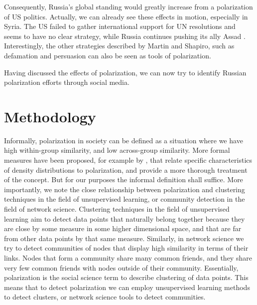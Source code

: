 \documentclass[12pt, authoryear]{elsarticle}
\begin{document}
Consequently, Russia's global standing would greatly increase from a polarization of US politics. Actually, we can already see these effects in motion, especially in Syria. The US failed to gather international support for UN resolutions and seems to have no clear strategy, while Russia continues pushing its ally Assad \citep{bolan_2019}. Interestingly, the other strategies described by Martin and Shapiro, such as defamation and persuasion can also be seen as tools of polarization.

Having discussed the effects of polarization, we can now try to identify Russian polarization efforts through social media.

\section{Methodology}
Informally, polarization in society can be defined as a situation where we have high within-group similarity, and low across-group similarity. More formal measures have been proposed, for example by \cite{duclos2004polarization}, that relate specific characteristics of density distributions to polarization, and provide a more thorough treatment of the concept. But for our purposes the informal definition shall suffice. More importantly, we note the close relationship between polarization and clustering techniques in the field of unsupervised learning, or community detection in the field of network science. Clustering techniques in the field of unsupervised learning aim to detect data points that naturally belong together because they are close by some measure in some higher dimensional space, and that are far from other data points by that same measure. Similarly, in network science we try to detect communities of nodes that display high similarity in terms of their links. Nodes that form a community share many common friends, and they share very few common friends with nodes outside of their community. Essentially, polarization is the social science term to describe clustering of data points. This means that to detect polarization we can employ unsupervised learning methods to detect clusters, or network science tools to detect communities.
\end{document}
